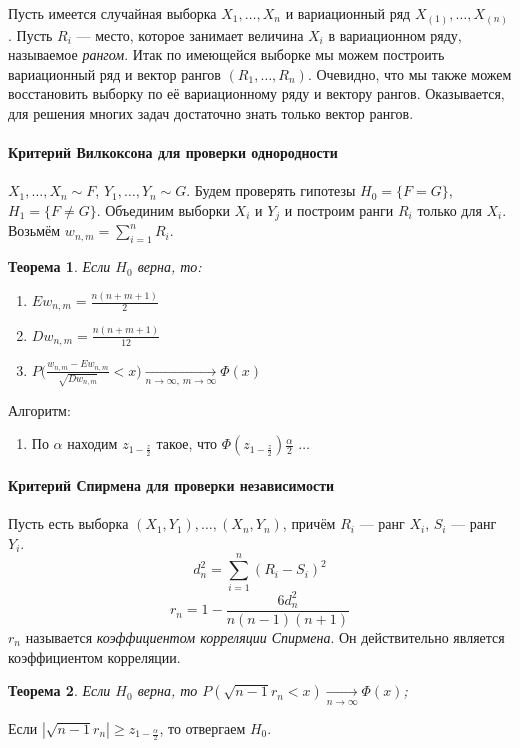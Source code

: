 \documentclass[11pt,openany,a4paper]{scrartcl}
\theoremstyle{plain}
\newtheorem{theorem}{Теорема}[subsection]
\theoremstyle{definition}
\newcommand{\underto}[1]{\xrightarrow[#1]{}}
\begin{document}
Пусть имеется случайная выборка $X_1, \ldots, X_n$ и вариационный ряд $X_{(1)}, \ldots, X_{(n)}$.
Пусть $R_i$ — место, которое занимает величина $X_i$ в вариационном ряду, называемое \emph{рангом}.
Итак по имеющейся выборке мы можем построить вариационный ряд и вектор рангов $(R_1, \ldots, R_n)$.
Очевидно, что мы также можем восстановить выборку по её вариационному ряду и вектору рангов.
Оказывается, для решения многих задач достаточно знать только вектор рангов.

\paragraph{Критерий Вилкоксона для проверки однородности}

$X_1, \ldots, X_n \sim F$, $Y_1, \ldots, Y_n \sim G$. Будем проверять гипотезы
$H_0 = \{F = G\}$, $H_1 = \{F \neq G\}$. Объединим выборки $X_i$ и $Y_j$ и построим ранги $R_i$
только для $X_i$. Возьмём $w_{n, m} = \sum\limits_{i=1}^n R_i$.

\begin{theorem}
    Если $H_0$ верна, то:
    \begin{enumerate}
        \item $Ew_{n,m} = \frac{n(n+m+1)}{2}$
        \item $Dw_{n,m} = \frac{n(n+m+1)}{12}$
        \item $P\bigg(\frac{w_{n,m} - Ew_{n,m}}{\sqrt{Dw_{n,m}}} < x\bigg)
        \underto{n \to \infty,\, m \to \infty} \Phi(x)$
    \end{enumerate}
\end{theorem}

Алгоритм:
\begin{enumerate}
    \item По $\alpha$ находим $z_{1-\frac{z}{2}}$ такое, что $\Phi(z_{1-\frac{z}{2}}) 
    \frac{\alpha}{2}$ $\ldots$ %
\end{enumerate}

\paragraph{Критерий Спирмена для проверки независимости}
Пусть есть выборка $(X_1, Y_1), \ldots, (X_n, Y_n)$, причём $R_i$ — ранг $X_i$, $S_i$ — ранг
$Y_i$.
$$
d_n^2 = \sum\limits_{i=1}^n(R_i - S_i)^2
$$
$$
r_n = 1 - \frac{6d_n^2}{n(n-1)(n+1)}
$$
$r_n$ называется \emph{коэффициентом корреляции Спирмена}. Он действительно является коэффициентом
корреляции.

\begin{theorem}
    Если $H_0$ верна, то $P(\sqrt{n-1} r_n < x) \underto{n \to \infty} \Phi(x)$;
\end{theorem}

Если $|\sqrt{n-1}r_n| \geqslant z_{1-\frac{\alpha}{2}}$, то отвергаем $H_0$.
\end{document}
